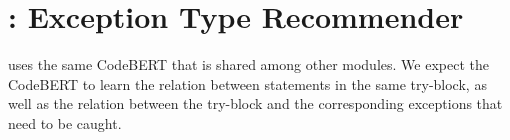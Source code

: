\section{{\xtype}: Exception Type Recommender}
\label{sec:type}

{\xtype} uses the same CodeBERT that is shared  among other modules. We expect the CodeBERT to learn the relation between statements in the same try-block, 
as well as the relation between the try-block and the corresponding exceptions that need to be caught. 


%
%
